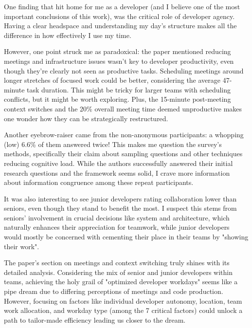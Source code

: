 \documentclass{article}
\begin{document}
One finding that hit home for me as a developer (and I believe one of the most important conclusions of this work), was the critical role of developer agency. Having a clear headspace and understanding my day's structure makes all the difference in how effectively I use my time.

However, one point struck me as paradoxical: the paper mentioned reducing meetings and infrastructure issues wasn't key to developer productivity, even though they're clearly not seen as productive tasks. Scheduling meetings around longer stretches of focused work could be better, considering the average 47-minute task duration. This might be tricky for larger teams with scheduling conflicts, but it might be worth exploring. Plus, the 15-minute post-meeting context switches and the 20\% overall meeting time deemed unproductive makes one wonder how they can be strategically restructured.

Another eyebrow-raiser came from the non-anonymous participants: a whopping (low) 6.6\% of them answered twice! This makes me question the survey's methods, specifically their claim about sampling questions and other techniques reducing cognitive load. While the authors successfully answered their initial research questions and the framework seems solid, I crave more information about information congruence among these repeat participants.

It was also interesting to see junior developers rating collaboration lower than seniors, even though they stand to benefit the most. I suspect this stems from seniors' involvement in crucial decisions like system and architecture, which naturally enhances their appreciation for teamwork, while junior developers would mostly be concerned with cementing their place in their teams by "showing their work".

The paper's section on meetings and context switching truly shines with its detailed analysis. Considering the mix of senior and junior developers within teams, achieving the holy grail of "optimized developer workdays" seems like a pipe dream due to differing perceptions of meetings and code production. However, focusing on factors like individual developer autonomy, location, team work allocation, and workday type (among the 7 critical factors) could unlock a path to tailor-made efficiency leading us closer to the dream.
\end{document}
